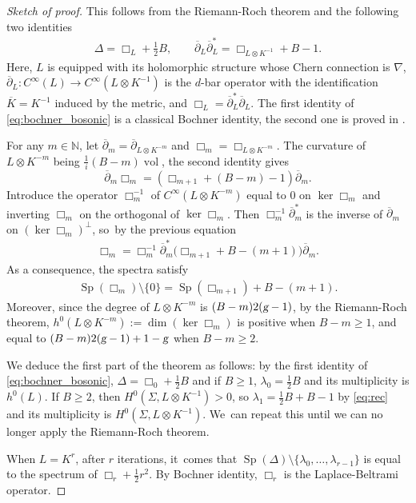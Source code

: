 \documentclass[10pt]{amsart}
\theoremstyle{plain}
\theoremstyle{definition}
\let\con\overline
\let\op\operatorname
\newcommand{\N}{\mathbb{N}}
\let\la\lambda
\begin{document}
\begin{proof}[Sketch of proof] This follows from the Riemann-Roch theorem and the
following two identities
\begin{gather} \label{eq:bochner_bosonic}
\Delta = \Box_L + \tfrac{1}{2} B, \qquad \con{\partial}_L
\con{\partial}_L^* = \Box_{L \otimes K^{-1}} +B -1.
\end{gather}
Here, $L$ is equipped with its holomorphic structure whose Chern connection
is $\nabla$, $\con{\partial}_L: C^{\infty} (L)
\rightarrow C^{\infty} (L \otimes K^{-1})$ is the $d$-bar
operator with the identification $\con{ K} = K^{-1}$ induced by
the metric, and $\Box_L = \con{\partial}_L^*
\con{\partial}_L$. The first identity of \eqref{eq:bochner_bosonic} is a
classical Bochner identity, the second one is proved in \cite[Th.\,7.1]{Landau1}.

For any $m \in \N$, let $\con{\partial}_m = \con{\partial}_{L \otimes
K^{-m}}$ and $\Box_m = \Box_{L \otimes K^{-m}}$. The curvature of $L
\otimes K^{-m}$ being $\frac{1}{i} (B -m) \op{vol}$, the second identity
gives
\[
\con{\partial}_m \Box_m = (
\Box_{m+1} + (B - m) - 1) \con{\partial}_m.\]
Introduce the operator $\Box_{m}^{-1}$
of $C^\infty(L \otimes K^{-m})$ equal to $0$ on $\ker \Box_m$
and inverting $\Box_m$ on the orthogonal of $\ker \Box_m$. Then
$\Box_m^{-1} \con{\partial}_m^*$ is the inverse of $\con{\partial}_m$ on
$(\ker \Box_m)^{\perp}$, so~by the previous equation
\begin{gather*}
\Box_m = \Box_m^{-1} \con{\partial}_m^* \bigl(\Box_{m+1} + B - (m+1)
\bigr) \con{\partial}_m.
\end{gather*}
As a consequence, the spectra satisfy
\begin{gather} \label{eq:rec}
\op{Sp} (\Box_m) \setminus \{ 0 \} = \op{Sp} (
\Box_{m+1}) + B - (m +1).
\end{gather}
Moreover, since the degree of $L \otimes K^{-m}$ is $(B- m) 2 (\textsl{g} -1)$, by
the Riemann-Roch theorem, $h^0 (L \otimes K^{-m}) := \op{dim} (\ker \Box_m)$ is
positive when $B - m \geqslant 1$, and equal to $(B-m) 2 (\textsl{g}-1) + 1 - \textsl{g}$ when
$B- m \geqslant 2 $.

We deduce the first part of the theorem as follows: by the first identity of
\eqref{eq:bochner_bosonic}, $\Delta = \Box_0 + \frac{1}{2} B$ and if $B
\geqslant 1$, $\la_0 = \tfrac{1}{2} B$ and its multiplicity is $h^0 (
L)$. If $B\geqslant 2$, then $H^{0} (\Sigma, L \otimes K^{-1}) >0$, so
$\la_1 =\frac{1}{2}B + B -1$ by \eqref{eq:rec} and its multiplicity is $H^{0}
(\Sigma, L \otimes K^{-1})$. We~can repeat this until we can no longer apply the Riemann-Roch theorem.

When $L = K^r$, after $r$ iterations, it~comes that $\op{Sp}(\Delta) \setminus \{ \la_0, \ldots, \la_{r-1} \}$
is equal to the spectrum of $\Box_r + \frac{1}{2} r^2$. By Bochner identity,
$\Box_r$ is the Laplace-Beltrami operator.
\end{proof}
\end{document}
